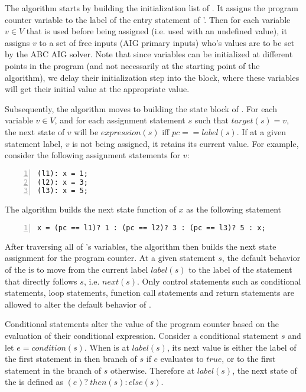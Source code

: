 The algorithm starts by building the initialization list
of \aigcircuit. It assigns the program counter variable
 to the label of the entry statement of \Pm'.
Then for each variable $v \in V$ that is used before
being assigned (i.e. used with an undefined value), it 
assigns $v$ to a set of free inputs (AIG primary inputs)
who's values are to be set by the ABC AIG solver. 
Note that since variables can be initialized at different
points in the program (and not necessarily at the starting
point of the algorithm), we delay their
initialization step 
into the  block, where these variables
will get their initial value at the appropriate 
value.

Subsequently, the algorithm moves to building the
 state block of \aigcircuit. For each 
variable $v \in V$, and for each assignment statement 
$s$ such that $target(s)=v$, the next state of $v$ will
be $expression(s)$ iff $pc == label(s)$. If at a given 
statement label, $v$ is not being assigned, it retains
its current value. For example, consider the 
following assignment
statements for $v$:
\begin{Verbatim}[fontsize=\relsize{-1.0}, numbersep=4pt,numbers=left]
(l1): x = 1;
(l2): x = 3;
(l3): x = 5;
\end{Verbatim}
The algorithm builds the next state function of $x$ as 
the following statement
\begin{Verbatim}[fontsize=\relsize{-1.0}, numbersep=4pt,numbers=left]
x = (pc == l1)? 1 : (pc == l2)? 3 : (pc == l3)? 5 : x;
\end{Verbatim}

After traversing all of \Pm's variables, the algorithm
then builds the next state assignment for the program counter.
At a given statement $s$, the default behavior of the  is to move from the current label $label (s)$
to the label of the statement that directly follows
$s$, i.e. $next(s)$. 
Only control statements such as conditional statements, 
loop statements, function call statements and return 
statements are allowed to alter the default behavior of 
.

Conditional statements alter the value of the 
program counter based on the evaluation of their
conditional expression. Consider a conditional statement
$s$ and let $e = condition(s)$. When  is at 
$label(s)$, its next value is either the label 
of the first statement in then  branch of $s$
if $e$ evaluates to $true$, or to the first
statement in the  branch of $s$ otherwise. 
Therefore at $label(s)$, the next state of the 
is defined as $(e)?~ then(s) : else(s)$.

